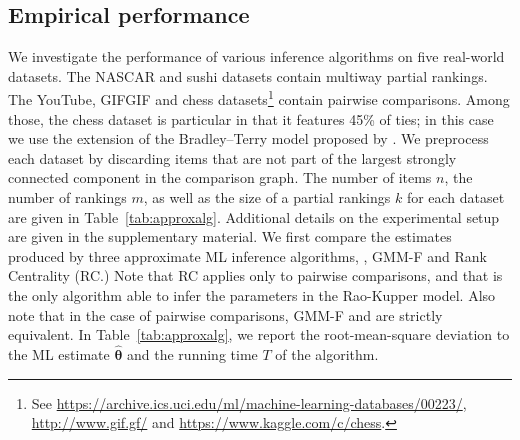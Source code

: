 \subsection{Empirical performance}

We investigate the performance of various inference algorithms on five real-world datasets.
The NASCAR \citep{hunter2004mm} and sushi \citep{kamishima2009efficient} datasets contain multiway partial rankings.
The YouTube, GIFGIF and chess datasets\footnote{
See \url{https://archive.ics.uci.edu/ml/machine-learning-databases/00223/}, \url{http://www.gif.gf/} and \url{https://www.kaggle.com/c/chess}.
} contain pairwise comparisons.
Among those, the chess dataset is particular in that it features 45\% of ties;
in this case we use the extension of the Bradley--Terry model proposed by \citet{rao1967ties}.
We preprocess each dataset by discarding items that are not part of the largest strongly connected component in the comparison graph.
The number of items $n$, the number of rankings $m$, as well as the size of a partial rankings $k$ for each dataset are given in Table~\ref{tab:approxalg}.
Additional details on the experimental setup are given in the supplementary material.
We first compare the estimates produced by three approximate ML inference algorithms, \LSR{}, GMM-F and Rank Centrality (RC.)
Note that RC applies only to pairwise comparisons, and that \LSR{} is the only algorithm able to infer the parameters in the Rao-Kupper model.
Also note that in the case of pairwise comparisons, GMM-F and \LSR{} are strictly equivalent.
In Table~\ref{tab:approxalg}, we report the root-mean-square deviation to the ML estimate $\hat{\bm{\theta}}$ and the running time $T$ of the algorithm.

